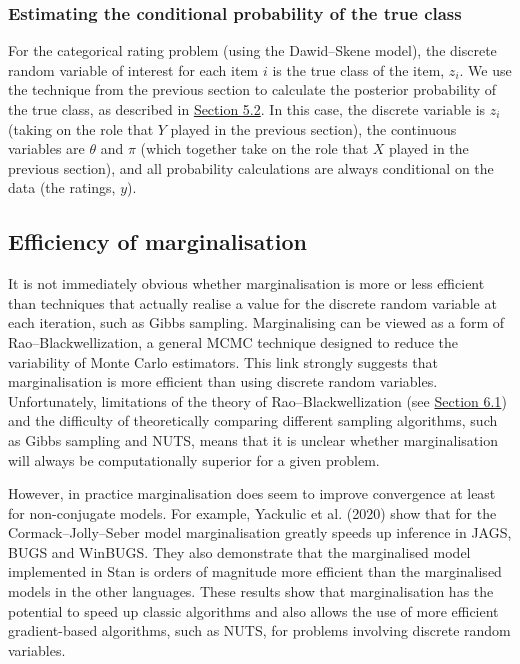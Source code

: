 \hypertarget{estimating-the-conditional-probability-of-the-true-class}{%
\subsubsection{Estimating the conditional probability of the true class}\label{estimating-the-conditional-probability-of-the-true-class}}

For the categorical rating problem (using the Dawid--Skene model), the
discrete random variable of interest for each item \(i\) is the true class
of the item, \({z}_{i}\). We use the technique from the previous section
to calculate the posterior probability of the true class, as described
in \protect\hyperlink{sec:conditioning}{Section 5.2}. In this case, the discrete variable is
\(z_i\) (taking on the role that \(Y\) played in the previous section), the
continuous variables are \(\theta\) and \(\pi\) (which together take on the
role that \(X\) played in the previous section), and all probability
calculations are always conditional on the data (the ratings, \(y\)).

\hypertarget{sec:marginalisation-effciency}{%
\subsection{Efficiency of marginalisation}\label{sec:marginalisation-effciency}}

It is not immediately obvious whether marginalisation is more or less
efficient than techniques that actually realise a value for the discrete
random variable at each iteration, such as Gibbs sampling. Marginalising
can be viewed as a form of Rao--Blackwellization, a general MCMC
technique designed to reduce the variability of Monte Carlo estimators.
This link strongly suggests that marginalisation is more efficient than
using discrete random variables. Unfortunately, limitations of the
theory of Rao--Blackwellization (see
\protect\hyperlink{sec:rao-blackwell-connection}{Section 6.1}) and the difficulty of
theoretically comparing different sampling algorithms, such as Gibbs
sampling and NUTS, means that it is unclear whether marginalisation will
always be computationally superior for a given problem.

However, in practice marginalisation does seem to improve convergence at
least for non-conjugate models. For example, Yackulic et al. (2020) show that for
the Cormack--Jolly--Seber model marginalisation greatly speeds up
inference in JAGS, BUGS and WinBUGS. They also demonstrate that the
marginalised model implemented in Stan is orders of magnitude more
efficient than the marginalised models in the other languages. These
results show that marginalisation has the potential to speed up classic
algorithms and also allows the use of more efficient gradient-based
algorithms, such as NUTS, for problems involving discrete random
variables.

